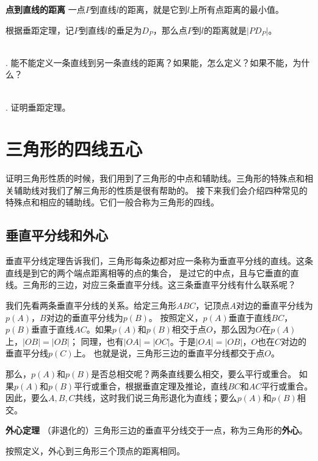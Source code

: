 \documentclass[12pt,UTF8]{ctexbook}
\begin{document}
\begin{df}{\textbf{点到直线的距离}}\label{df:0-2-0}
    一点$P$到直线$l$的距离，就是它到$l$上所有点距离的最小值。
\end{df}
根据垂距定理，记$P$到直线$l$的垂足为$D_P$，那么点$P$到$l$的距离就是$|PD_P|$。

\begin{sk}\label{sk:0-2-0}
    \mbox{} \\
    . 能不能定义一条直线到另一条直线的距离？如果能，怎么定义？如果不能，为什么？
\end{sk}

\begin{xt}\label{xt:0-2-0} 
    \mbox{} \\
    . 证明垂距定理。\\

\end{xt}

\chapter{三角形的四线五心}
证明三角形性质的时候，我们用到了三角形的中点和辅助线。三角形的特殊点和相关辅助线对我们了解三角形的性质是很有帮助的。
接下来我们会介绍四种常见的特殊点和相应的辅助线。它们一般合称为三角形的四线。

\section{垂直平分线和外心}
垂直平分线定理告诉我们，三角形每条边都对应一条称为垂直平分线的直线。这条直线是到它的两个端点距离相等的点的集合，
是过它的中点，且与它垂直的直线。三角形的三边，对应三条垂直平分线。这三条垂直平分线有什么联系呢？

我们先看两条垂直平分线的关系。给定三角形$ABC$，记顶点$A$对边的垂直平分线为$p(A)$，$B$对边的垂直平分线为$p(B)$。
按照定义，$p(A)$垂直于直线$BC$，$p(B)$垂直于直线$AC$。如果$p(A)$和$p(B)$相交于点$O$，那么因为$O$在$p(A)$上，$|OB| = |OB|$；
同理，也有$|OA| = |OC|$。于是$|OA| = |OB|$，$O$也在$C$对边的垂直平分线$p(C)$上。
也就是说，三角形三边的垂直平分线都交于点$O$。

那么，$p(A)$和$p(B)$是否总相交呢？两条直线要么相交，要么平行或重合。
如果$p(A)$和$p(B)$平行或重合，根据垂直定理及推论，直线$BC$和$AC$平行或重合。
因此，要么$A,B,C$共线，这时我们说三角形退化为直线；要么$p(A)$和$p(B)$相交。
\begin{tm}{\textbf{外心定理}}\label{tm:1-0-0}
    （非退化的）三角形三边的垂直平分线交于一点，称为三角形的\textbf{外心}。
\end{tm}
按照定义，外心到三角形三个顶点的距离相同。
\end{document}
